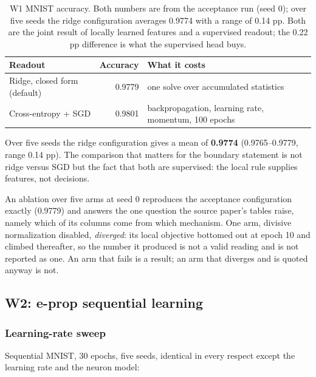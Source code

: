 \documentclass[11pt]{article}
\begin{document}
\begin{table}[h]
\centering
\small
\begin{tabular}{@{}lrp{}@{}}
\toprule
Readout & Accuracy & What it costs \\
\midrule
Ridge, closed form (default) & 0.9779 & one solve over accumulated statistics \\
Cross-entropy + SGD & 0.9801 & backpropagation, learning rate, momentum, 100 epochs \\
\bottomrule
\end{tabular}
\caption{W1 MNIST accuracy. Both numbers are from the acceptance run (seed 0);
over five seeds the ridge configuration averages 0.9774 with a range of 0.14 pp.
Both are the joint result of locally learned features and a supervised readout;
the 0.22 pp difference is what the supervised head buys.}
\label{tab:w1}
\end{table}

Over five seeds the ridge configuration gives a mean of \textbf{0.9774}
(0.9765--0.9779, range 0.14 pp). The comparison that matters for the boundary
statement is not ridge versus SGD but the fact that both are supervised: the
local rule supplies features, not decisions.

An ablation over five arms at seed 0 reproduces the acceptance configuration
exactly (0.9779) and answers the one question the source paper's tables raise,
namely which of its columns come from which mechanism. One arm, divisive
normalization disabled, \emph{diverged}: its local objective bottomed out at
epoch 10 and climbed thereafter, so the number it produced is not a valid
reading and is not reported as one. An arm that fails is a result; an arm that
diverges and is quoted anyway is not.

\subsection{W2: e-prop sequential learning}
\subsubsection{Learning-rate sweep}
Sequential MNIST, 30 epochs, five seeds, identical in every respect except the
learning rate and the neuron model:
\end{document}
